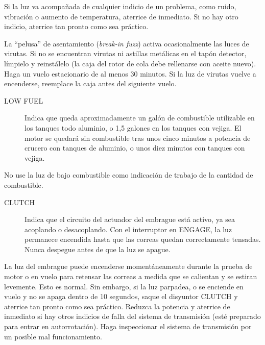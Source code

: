 \begin{nota}
Si la luz va acompañada de cualquier indicio de un problema, como ruido, vibración o aumento de temperatura, aterrice de inmediato. Si no hay otro indicio, aterrice tan pronto como sea práctico.

La ``pelusa'' de asentamiento (\emph{break-in fuzz}) activa ocasionalmente las luces de virutas. Si no se encuentran virutas ni astillas metálicas en el tapón detector, límpielo y reinstálelo (la caja del rotor de cola debe rellenarse con aceite nuevo). Haga un vuelo estacionario de al menos 30 minutos. Si la luz de virutas vuelve a encenderse, reemplace la caja antes del siguiente vuelo.
\end{nota}

\begin{description}
\item[\textsf{LOW FUEL}] Indica que queda aproximadamente un galón de combustible utilizable en los tanques todo aluminio, o 1,5 galones en los tanques con vejiga. El motor se quedará sin combustible tras unos cinco minutos a potencia de crucero con tanques de aluminio, o unos diez minutos con tanques con vejiga.
\end{description}

\begin{precaucion}
No use la luz de bajo combustible como indicación de trabajo de la cantidad de combustible.
\end{precaucion}

\begin{description}
\item[\textsf{CLUTCH}] Indica que el circuito del actuador del embrague está activo, ya sea acoplando o desacoplando. Con el interruptor en \textsf{ENGAGE}, la luz permanece encendida hasta que las correas quedan correctamente tensadas. Nunca despegue antes de que la luz se apague.
\end{description}

\begin{nota}
La luz del embrague puede encenderse momentáneamente durante la prueba de motor o en vuelo para retensar las correas a medida que se calientan y se estiran levemente. Esto es normal. Sin embargo, si la luz parpadea, o se enciende en vuelo y no se apaga dentro de 10 segundos, saque el disyuntor \textsf{CLUTCH} y aterrice tan pronto como sea práctico. Reduzca la potencia y aterrice de inmediato si hay otros indicios de falla del sistema de transmisión (esté preparado para entrar en autorrotación). Haga inspeccionar el sistema de transmisión por un posible mal funcionamiento.
\end{nota}

